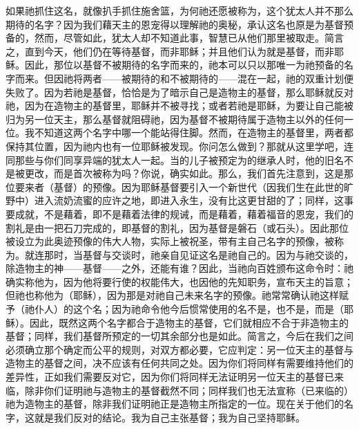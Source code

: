 如果祂抓住这名，就像扒手抓住施舍篮，为何祂还愿被称为，这个犹太人并不那么期待的名字？因为我们藉天主的恩宠得以理解祂的奥秘，承认这名也原是为基督预备的，然而，尽管如此，犹太人却不知道此事，智慧已从他们那里被取走。简言之，直到今天，他们仍在等待基督，而非耶稣；并且他们认为就是基督，而非耶稣。因此，那位以基督不被期待的名字而来的，祂本可以只以那唯一为祂预备的名字而来。但因祂将两者——被期待的和不被期待的——混在一起，祂的双重计划便失败了。因为若祂是基督，恰恰是为了暗示自己是造物主的基督，那么耶稣就反对祂，因为在造物主的基督里，耶稣并不被寻找；或者若祂是耶稣，为要让自己能被归为另一位天主，那么基督就阻碍祂，因为基督不被期待属于造物主以外的任何一位。我不知道这两个名字中哪一个能站得住脚。然而，在造物主的基督里，两者都保持其位置，因为祂内也有一位耶稣被发现。你问怎么做到？那就从这里学吧，连同那些与你们同享异端的犹太人一起。当的儿子被预定为的继承人时，他的旧名不是被更改，而是首次被称为吗？你说，确实如此。那么，我们首先注意到，这是那位要来者（基督）的预像。因为耶稣基督要引入一个新世代（因我们生在此世的旷野中）进入流奶流蜜的应许之地，即进入永生，没有比这更甘甜的了；同样，这事要成就，不是藉着，即不是藉着法律的规诫，而是藉着，藉着福音的恩宠，我们的割礼是由一把石刀完成的，即基督的割礼，因为基督是磐石（或石头）。因此那位被设立为此奥迹预像的伟大人物，实际上被祝圣，带有主自己名字的预像，被称为。就连那时，当基督与交谈时，祂亲自见证这名是祂自己的。因为与祂交谈的，除造物主的神——基督——之外，还能有谁？因此，当祂向百姓颁布这命令时：祂确实称他为，因为他将要行使的权能伟大，也因他的先知职务，宣布天主的旨意；但祂也称他为（耶稣），因为那是对祂自己未来名字的预像。祂常常确认祂这样赋予（祂仆人）的这个名；因为祂命令他今后惯常使用的名不是，也不是，而是（耶稣）。因此，既然这两个名字都合于造物主的基督，它们就相应不合于非造物主的基督；同样，我们基督所预定的一切其余部分也是如此。简言之，今后在我们之间必须确立那个确定而公平的规则，对双方都必要，它应判定：另一位天主的基督与造物主的基督之间，决不应该有任何共同之处。因为你们将同样有需要维持他们的差异性，正如我们需要反对它，因为你们将同样无法证明另一位天主的基督已来临，除非你们证明祂与造物主的基督截然不同；同样我们也无法宣称（已来临的）祂为造物主的基督，除非我们证明祂正是造物主所指定的一位。现在关于他们的名字，这就是我们反对的结论。我为自己主张基督；我为自己坚持耶稣。\par

